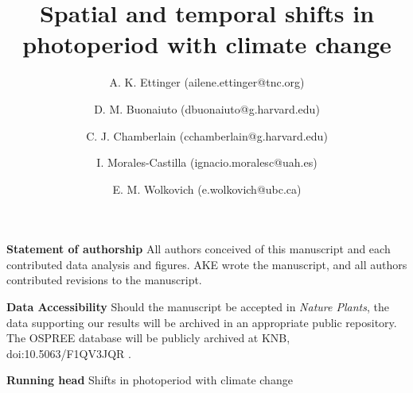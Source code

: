 \documentclass{article}
\begin{document}



\title{Spatial and temporal shifts in photoperiod with climate change} %


\author[1,2,a]{A. K. Ettinger (ailene.ettinger@tnc.org)}
\author[2,3]{D. M. Buonaiuto (dbuonaiuto@g.harvard.edu)}

\author[2,3]{C. J. Chamberlain (cchamberlain@g.harvard.edu)}

\author[2,3,4,5]{I. Morales-Castilla (ignacio.moralesc@uah.es)}

\author[2,3,6]{E. M. Wolkovich (e.wolkovich@ubc.ca)}






 



\maketitle %
\textbf{Statement of authorship} 
All authors conceived of this manuscript and each contributed data analysis and figures. AKE wrote the manuscript, and all authors contributed revisions to the manuscript. 

\textbf{Data Accessibility} Should the manuscript be accepted in \emph{Nature Plants}, the data supporting our results will be archived in an appropriate public repository. The OSPREE database will be publicly archived at KNB, doi:10.5063/F1QV3JQR \citep{wolkovich2019}.

\textbf{Running head} Shifts in photoperiod with climate change
\end{document}
